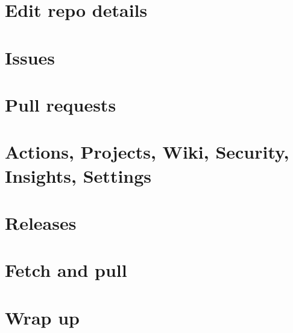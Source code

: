 \documentclass[12pt]{article}
\begin{document}
\section{Edit repo details}
\section{Issues}
\section{Pull requests}
\section{Actions, Projects, Wiki, Security, Insights, Settings}
\section{Releases}
\section{Fetch and pull}
\section{Wrap up}
\end{document}
